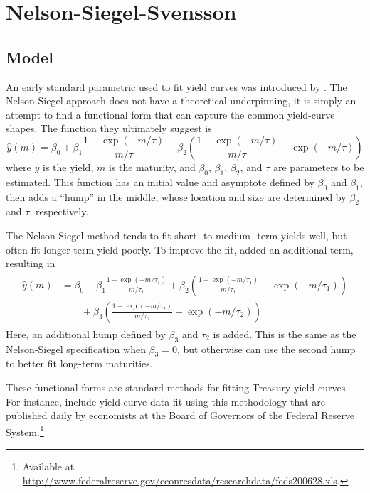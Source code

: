 \documentclass[12pt]{article}
\begin{document}
\section{Nelson-Siegel-Svensson}

\subsection{Model}

An early standard parametric used to fit yield curves was introduced by \citet{nelsonsiegel1987}. The Nelson-Siegel approach does not have a theoretical underpinning, it is simply an attempt to find a functional form that can capture the common yield-curve shapes. The function they ultimately suggest is
\begin{equation}
\hat{y}(m) = \beta_0
    + \beta_1 \frac{1-\exp(-m/\tau)}{m/\tau}
    + \beta_2 \left( \frac{1-\exp(-m/\tau)}{m/\tau} - \exp(-m/\tau) \right)
\label{eq:ns}
\end{equation}
where $y$ is the yield, $m$ is the maturity, and $\beta_0$, $\beta_1$, $\beta_2$, and $\tau$ are parameters to be estimated. This function has an initial value and asymptote defined by $\beta_0$ and $\beta_1$, then adds a ``hump'' in the middle, whose location and size are determined by $\beta_2$ and $\tau$, respectively.

The Nelson-Siegel method tends to fit short- to medium- term yields well, but often fit longer-term yield poorly. To improve the fit, \citet{svensson1994} added an additional term, resulting in
\begin{align}
\begin{split}
\hat{y}(m) &= \beta_0
    + \beta_1 \frac{1-\exp(-m/\tau_1)}{m/\tau_1}
    + \beta_2 \left( \frac{1-\exp(-m/\tau_1)}{m/\tau_1} - \exp(-m/\tau_1) \right) \\
    &\qquad+ \beta_3 \left( \frac{1-\exp(-m/\tau_2)}{m/\tau_2} - \exp(-m/\tau_2) \right)
\end{split} \label{eq:svensson}
\end{align}
Here, an additional hump defined by $\beta_3$ and $\tau_2$ is added. This is the same as the Nelson-Siegel specification when $\beta_3 = 0$, but otherwise can use the second hump to better fit long-term maturities.

These functional forms are standard methods for fitting Treasury yield curves. For instance, \citet{gsw06} include yield curve data fit using this methodology that are published daily by economists at the Board of Governors of the Federal Reserve System.\footnote{Available at \url{http://www.federalreserve.gov/econresdata/researchdata/feds200628.xls}.}
\end{document}
